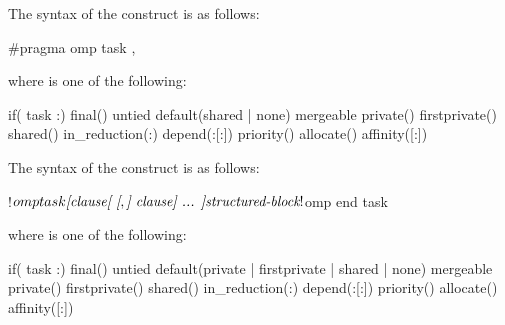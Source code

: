 \syntax
\begin{ccppspecific}
\begin{samepage}
The syntax of the  construct is as follows:

\begin{ompcPragma}
#pragma omp task \plc{[clause[ [},\plc{] clause] ... ] new-line}
\end{ompcPragma}
\end{samepage}

\begin{samepage}
where  is one of the following{}:

\begin{indentedcodelist}
if(\plc{[} task :\plc{] scalar-expression})
final()
untied
default(shared \textnormal{|} none)
mergeable
private()
firstprivate()
shared()
in_reduction(:)
depend(:[:])
priority()
allocate(\plc{[allocator: ]})
affinity([:])
\end{indentedcodelist}
\end{samepage}
\end{ccppspecific}

\begin{fortranspecific}
The syntax of the  construct is as follows:

\begin{ompfPragma}
!$omp task \plc{[clause[ [},\plc{] clause] ... ]}
    \plc{structured-block}
!$omp end task
\end{ompfPragma}

where  is one of the following{}:

\begin{indentedcodelist}
if(\plc{[} task :\plc{] scalar-logical-expression})
final()
untied
default(private \textnormal{|} firstprivate \textnormal{|} shared \textnormal{|} none)
mergeable
private()
firstprivate()
shared()
in_reduction(:)
depend(:[:])
priority()
allocate(\plc{[allocator: ]})
affinity([:])
\end{indentedcodelist}
\end{fortranspecific}

